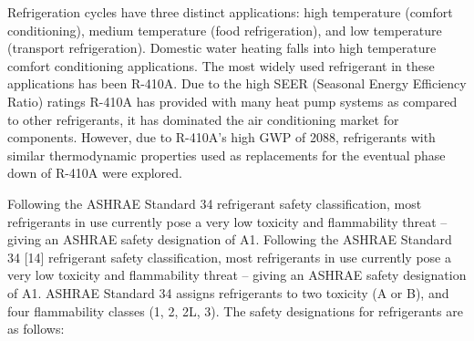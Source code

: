 \medskip
Refrigeration cycles have three distinct applications: high temperature (comfort conditioning), medium temperature (food refrigeration), and low temperature (transport refrigeration). Domestic water heating falls into high temperature comfort conditioning applications. The most widely used refrigerant in these applications has been R-410A. Due to the high SEER (Seasonal Energy Efficiency Ratio) ratings R-410A has provided with many heat pump systems as compared to other refrigerants, it has dominated the air conditioning market for components. However, due to R-410A’s high GWP of 2088, refrigerants with similar thermodynamic properties used as replacements for the eventual phase down of R-410A were explored.

\newpage
Following the ASHRAE Standard 34 refrigerant safety classification, most refrigerants in use currently pose a very low toxicity and flammability threat – giving an ASHRAE safety designation of A1. Following the ASHRAE Standard 34 [14] refrigerant safety classification, most refrigerants in use currently pose a very low toxicity and flammability threat – giving an ASHRAE safety designation of A1. ASHRAE Standard 34 assigns refrigerants to two toxicity (A or B), and four flammability classes (1, 2, 2L, 3). The safety designations for refrigerants are as follows:

